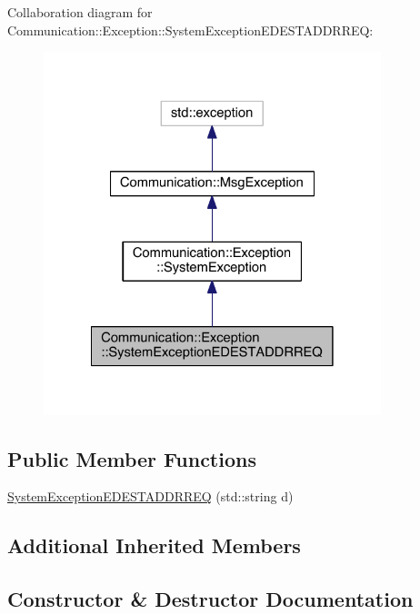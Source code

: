 Collaboration diagram for Communication\+:\+:Exception\+:\+:System\+Exception\+E\+D\+E\+S\+T\+A\+D\+D\+R\+R\+E\+Q\+:\nopagebreak
\begin{figure}[H]
\begin{center}
\leavevmode
\includegraphics[width=278pt]{class_communication_1_1_exception_1_1_system_exception_e_d_e_s_t_a_d_d_r_r_e_q__coll__graph}
\end{center}
\end{figure}
\subsection*{Public Member Functions}
\begin{DoxyCompactItemize}
\item 
\hyperlink{class_communication_1_1_exception_1_1_system_exception_e_d_e_s_t_a_d_d_r_r_e_q_a984302ad1d80251706c782ab89b617eb}{System\+Exception\+E\+D\+E\+S\+T\+A\+D\+D\+R\+R\+E\+Q} (std\+::string d)
\end{DoxyCompactItemize}
\subsection*{Additional Inherited Members}


\subsection{Constructor \& Destructor Documentation}
\hypertarget{class_communication_1_1_exception_1_1_system_exception_e_d_e_s_t_a_d_d_r_r_e_q_a984302ad1d80251706c782ab89b617eb}{}
